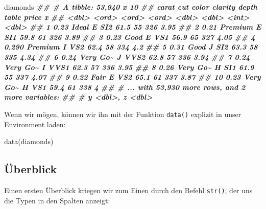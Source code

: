 \documentclass[
  ngerman,
]{article}
\newenvironment{Shaded}{\begin{snugshade}}{\end{snugshade}}
\newcommand{\DocumentationTok}[1]{\textcolor[rgb]{0.56,0.35,0.01}{\textbf{\textit{#1}}}}
\newcommand{\FunctionTok}[1]{\textcolor[rgb]{0.00,0.00,0.00}{#1}}
\newcommand{\NormalTok}[1]{#1}
\begin{document}
\begin{Shaded}
\begin{Highlighting}[]
\NormalTok{diamonds}
\DocumentationTok{\#\# \# A tibble: 53,940 x 10}
\DocumentationTok{\#\#    carat cut      color clarity depth table price     x}
\DocumentationTok{\#\#    \textless{}dbl\textgreater{} \textless{}ord\textgreater{}    \textless{}ord\textgreater{} \textless{}ord\textgreater{}   \textless{}dbl\textgreater{} \textless{}dbl\textgreater{} \textless{}int\textgreater{} \textless{}dbl\textgreater{}}
\DocumentationTok{\#\#  1 0.23  Ideal    E     SI2      61.5    55   326  3.95}
\DocumentationTok{\#\#  2 0.21  Premium  E     SI1      59.8    61   326  3.89}
\DocumentationTok{\#\#  3 0.23  Good     E     VS1      56.9    65   327  4.05}
\DocumentationTok{\#\#  4 0.290 Premium  I     VS2      62.4    58   334  4.2 }
\DocumentationTok{\#\#  5 0.31  Good     J     SI2      63.3    58   335  4.34}
\DocumentationTok{\#\#  6 0.24  Very Go\textasciitilde{} J     VVS2     62.8    57   336  3.94}
\DocumentationTok{\#\#  7 0.24  Very Go\textasciitilde{} I     VVS1     62.3    57   336  3.95}
\DocumentationTok{\#\#  8 0.26  Very Go\textasciitilde{} H     SI1      61.9    55   337  4.07}
\DocumentationTok{\#\#  9 0.22  Fair     E     VS2      65.1    61   337  3.87}
\DocumentationTok{\#\# 10 0.23  Very Go\textasciitilde{} H     VS1      59.4    61   338  4   }
\DocumentationTok{\#\# \# ... with 53,930 more rows, and 2 more variables:}
\DocumentationTok{\#\# \#   y \textless{}dbl\textgreater{}, z \textless{}dbl\textgreater{}}
\end{Highlighting}
\end{Shaded}

Wenn wir mögen, können wir ihn mit der Funktion \texttt{data()} explizit in unser Environment laden:

\begin{Shaded}
\begin{Highlighting}[]
\FunctionTok{data}\NormalTok{(diamonds)}
\end{Highlighting}
\end{Shaded}

\hypertarget{uxfcberblick-1}{%
\subsection{Überblick}\label{uxfcberblick-1}}

Einen ersten Überblick kriegen wir zum Einen durch den Befehl \texttt{str()}, der uns die Typen in den Spalten anzeigt:
\end{document}
